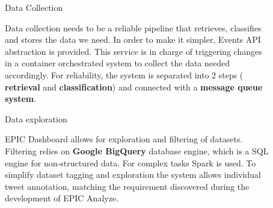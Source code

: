 \documentclass[final]{beamer}
\newlength{\sepwid}
\newlength{\onecolwid}
\newlength{\twocolwid}
\begin{document}
\begin{darkframes}
\begin{frame}
\begin{columns}[t]
\begin{column}{\onecolwid}
\end{column} %

\begin{column}{\sepwid}\end{column} %

\begin{column}{\twocolwid} %

\begin{columns}[t,totalwidth=\twocolwid] %

\begin{column}{\onecolwid}\vspace{-.74in} %


\begin{exampleblock}{Data Collection}

Data collection needs to be a reliable pipeline that retrieves, classifies and stores the data we need. In order to make it simpler, Events API abstraction is provided. This service is in charge of triggering changes in a container orchestrated system to collect the data needed accordingly. For reliability, the system is separated into 2 steps ( \textbf{retrieval} and \textbf{classification}) and connected with a \textbf{message queue system}.

\end{exampleblock}
\begin{exampleblock}{Data exploration}

EPIC Dashboard allows for exploration and filtering of datasets. Filtering relies on \textbf{Google BigQuery} database engine, which is a SQL engine for non-structured data. For complex tasks Spark is used. To simplify dataset tagging and exploration the system allows individual tweet annotation, matching the requirement discovered during the development of EPIC Analyze. \cite{anderson2015design}

\end{exampleblock}

\end{column} %
\begin{column}{\sepwid}\end{column} %


\end{columns}
\end{column}
\end{columns}
\end{frame}
\end{darkframes}
\end{document}
